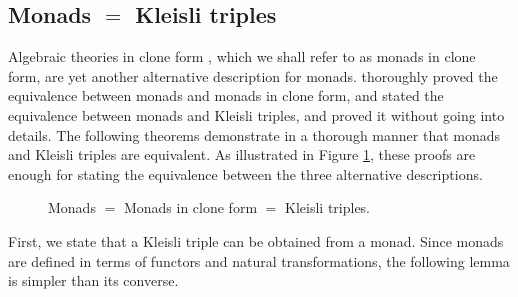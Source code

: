 \subsection*{Monads $=$ Kleisli triples}

Algebraic theories in clone form \parencite[24]{manes-1976}, which we
shall refer to as monads in clone form, are yet another alternative
description for monads. \textcite[26--29]{manes-1976} thoroughly
proved the equivalence between monads and monads in clone form, and
\textcite[61]{moggi-1991} stated the equivalence between monads and
Kleisli triples, and proved it without going into details. The
following theorems demonstrate in a thorough manner that monads and
Kleisli triples are equivalent. As illustrated in Figure
\ref{fig:monad-theory-triple}, these proofs are enough for stating the
equivalence between the three alternative descriptions.

\begin{figure}[htb]
  \begin{center}
  \end{center}
  \caption{Monads $=$ Monads in clone form $=$ Kleisli triples.}
  \label{fig:monad-theory-triple}
\end{figure}

First, we state that a Kleisli triple can be obtained from a monad.
Since monads are defined in terms of functors and natural
transformations, the following lemma is simpler than its converse.

